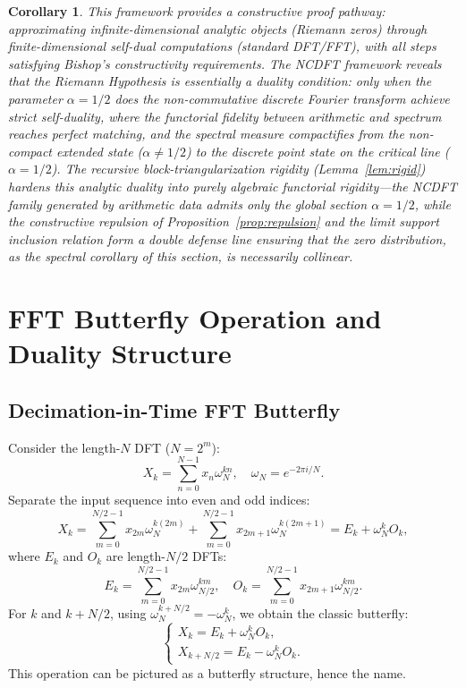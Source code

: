 \documentclass[12pt,a4paper]{amsart}
\theoremstyle{plain}
\newtheorem{corollary}[theorem]{Corollary}
\theoremstyle{definition}
\theoremstyle{remark}
\begin{document}
\begin{corollary}
This framework provides a constructive proof pathway: approximating infinite-dimensional analytic objects (Riemann zeros) through finite-dimensional self-dual computations (standard DFT/FFT), with all steps satisfying Bishop's constructivity requirements. The NCDFT framework reveals that the Riemann Hypothesis is essentially a duality condition: only when the parameter $\alpha=1/2$ does the non-commutative discrete Fourier transform achieve strict self-duality, where the functorial fidelity between arithmetic and spectrum reaches perfect matching, and the spectral measure compactifies from the non-compact extended state ($\alpha \neq 1/2$) to the discrete point state on the critical line ($\alpha = 1/2$). The recursive block-triangularization rigidity (Lemma~\ref{lem:rigid}) hardens this analytic duality into purely algebraic functorial rigidity---the NCDFT family generated by arithmetic data admits only the global section $\alpha=1/2$, while the constructive repulsion of Proposition~\ref{prop:repulsion} and the limit support inclusion relation form a double defense line ensuring that the zero distribution, as the spectral corollary of this section, is necessarily collinear.
\end{corollary}

\appendix
\section{FFT Butterfly Operation and Duality Structure}

\subsection{Decimation-in-Time FFT Butterfly}

Consider the length-$N$ DFT ($N=2^m$):
\[
X_k = \sum_{n=0}^{N-1} x_n \omega_N^{kn}, \quad \omega_N = e^{-2\pi i/N}.
\]
Separate the input sequence into even and odd indices:
\[
X_k = \sum_{m=0}^{N/2-1} x_{2m} \omega_N^{k(2m)} + \sum_{m=0}^{N/2-1} x_{2m+1} \omega_N^{k(2m+1)} = E_k + \omega_N^k O_k,
\]
where $E_k$ and $O_k$ are length-$N/2$ DFTs:
\[
E_k = \sum_{m=0}^{N/2-1} x_{2m} \omega_{N/2}^{km}, \quad O_k = \sum_{m=0}^{N/2-1} x_{2m+1} \omega_{N/2}^{km}.
\]
For $k$ and $k+N/2$, using $\omega_N^{k+N/2} = -\omega_N^k$, we obtain the classic butterfly:
\[
\begin{cases}
X_k = E_k + \omega_N^k O_k, \\
X_{k+N/2} = E_k - \omega_N^k O_k.
\end{cases}
\]
This operation can be pictured as a butterfly structure, hence the name.
\end{document}
